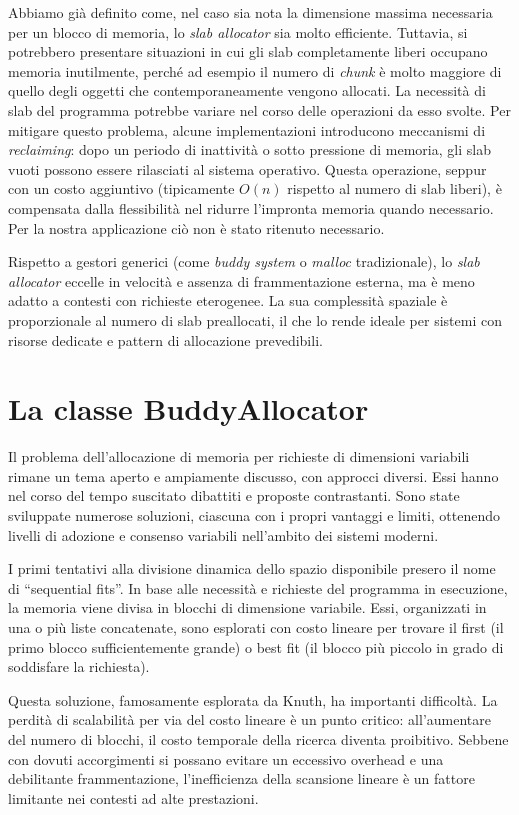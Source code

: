 Abbiamo già definito come, nel caso sia nota la dimensione massima necessaria per un blocco di memoria, lo \textit{slab allocator} sia molto efficiente. Tuttavia, si potrebbero presentare situazioni in cui gli slab completamente liberi occupano memoria inutilmente, perché ad esempio il numero di \textit{chunk} è molto maggiore di quello degli oggetti che contemporaneamente vengono allocati. La necessità di slab del programma potrebbe variare nel corso delle operazioni da esso svolte. Per mitigare questo problema, alcune implementazioni introducono meccanismi di \textit{reclaiming}: dopo un periodo di inattività o sotto pressione di memoria, gli slab vuoti possono essere rilasciati al sistema operativo. Questa operazione, seppur con un costo aggiuntivo (tipicamente $O(n)$ rispetto al numero di slab liberi), è compensata dalla flessibilità nel ridurre l’impronta memoria quando necessario. Per la nostra applicazione ciò non è stato ritenuto necessario.

Rispetto a gestori generici (come \textit{buddy system} o \textit{malloc} tradizionale), lo \textit{slab allocator} eccelle in velocità e assenza di frammentazione esterna, ma è meno adatto a contesti con richieste eterogenee. La sua complessità spaziale è proporzionale al numero di slab preallocati, il che lo rende ideale per sistemi con risorse dedicate e pattern di allocazione prevedibili.

\section{La classe BuddyAllocator}
Il problema dell’allocazione di memoria per richieste di dimensioni variabili rimane un tema aperto e ampiamente discusso, con approcci diversi. Essi hanno nel corso del tempo suscitato dibattiti e proposte contrastanti. Sono state sviluppate numerose soluzioni, ciascuna con i propri vantaggi e limiti, ottenendo livelli di adozione e consenso variabili nell'ambito dei sistemi moderni.

I primi tentativi alla divisione dinamica dello spazio disponibile presero il nome di “sequential fits”. In base alle necessità e richieste del programma in esecuzione, la memoria viene divisa in blocchi di dimensione variabile. Essi, organizzati in una o più liste concatenate, sono esplorati con costo lineare per trovare il first (il primo blocco sufficientemente grande) o best fit (il blocco più piccolo in grado di soddisfare la richiesta).

Questa soluzione, famosamente esplorata da Knuth, ha importanti difficoltà. La perdità di scalabilità per via del costo lineare è un punto critico: all’aumentare del numero di blocchi, il costo temporale della ricerca diventa proibitivo. Sebbene con dovuti accorgimenti si possano evitare un eccessivo overhead e una debilitante frammentazione, l’inefficienza della scansione lineare è un fattore limitante nei contesti ad alte prestazioni.

